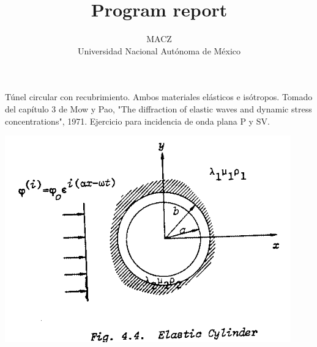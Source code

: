 \documentclass [11pt,spanish]{article}
\begin{document}
\title {Program report}
\author {MACZ\\
Universidad Nacional Aut\'onoma de M\'exico}
\maketitle 

\graphicspath{{./fig/}}

Túnel circular con recubrimiento. Ambos materiales elásticos e isótropos. Tomado del capítulo 3 de Mow y Pao, "The diffraction of elastic waves and dynamic stress concentrations", 1971. 
Ejercicio para incidencia de onda plana P y SV.

\includegraphics[scale=0.5]{figura}
\begingroup
\fontsize{10pt}{12pt}
\selectfont
{}
\end{document}

